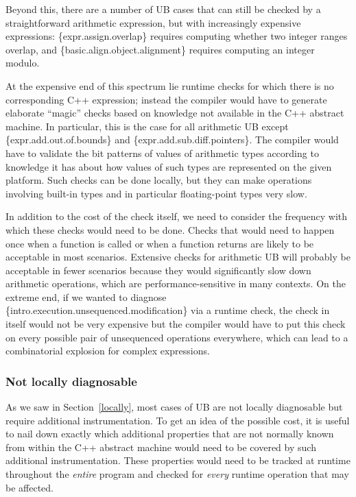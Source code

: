 Beyond this, there are a number of UB cases that can still be checked by a straightforward arithmetic expression, but with increasingly expensive expressions: \{expr.assign.overlap\} requires computing whether two integer ranges overlap, and  \{basic.align.object.alignment\} requires computing an integer modulo. 

At the expensive end of this spectrum lie runtime checks for which there is no corresponding C++ expression; instead the compiler would have to generate elaborate ``magic'' checks based on knowledge not available in the C++ abstract machine. In particular, this is the case for all arithmetic UB except \{expr.add.out.of.bounds\} and
\{expr.add.sub.diff.pointers\}. The compiler would have to validate the bit patterns of values of arithmetic types according to knowledge it has about how values of such types are represented on the given platform. Such checks can be done locally, but they can make operations involving built-in types and in particular floating-point types very slow.

In addition to the cost of the check itself, we need to consider the frequency with which these checks would need to be done. Checks that would need to happen once when a function is called or when a function returns are likely to be acceptable in most scenarios. Extensive checks for arithmetic UB will probably be acceptable in fewer scenarios because they would significantly slow down arithmetic operations, which are performance-sensitive in many contexts. On the extreme end, if we wanted to diagnose \{intro.execution.unsequenced.modification\} via a runtime check, the check in itself would not be very expensive but the compiler would have to put this check on every possible pair of unsequenced operations everywhere, which can lead to a combinatorial explosion for complex expressions.
\subsubsection{Not locally diagnosable}

As we saw in Section~\ref{locally}, most cases of UB are not locally diagnosable but require additional instrumentation. To get an idea of the possible cost, it is useful to nail down exactly which additional properties that are not normally known from within the C++ abstract machine would need to be covered by such additional instrumentation. These properties would need to be tracked  at runtime throughout the \emph{entire} program and checked for \emph{every} runtime operation that may be affected.

